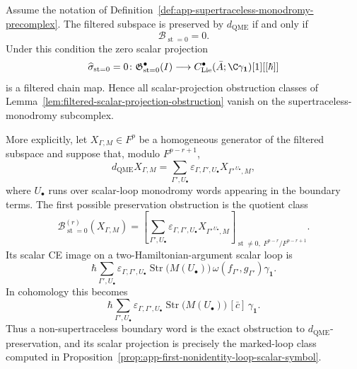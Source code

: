 \begin{thm}
\label{thm:app-supertraceless-monodromy-projection}
  Assume the notation of
  Definition~\ref{def:app-supertraceless-monodromy-precomplex}.  The
  filtered subspace is preserved by \(d_{\mathrm{QME}}\) if and only if
  \[
    \mathcal B_{\operatorname{st}=0}=0 .
  \]
  Under this condition the zero scalar projection
  \[
    \widehat\sigma_{\operatorname{st}=0}=0\colon
    \mathfrak G^\bullet_{\operatorname{st}=0}(I)
      \longrightarrow
    C^\bullet_{\mathrm{Lie}}(\bar A;\C\gamma_{\mathbf 1})[1][[\hbar]]
  \]
  is a filtered chain map.  Hence all scalar-projection obstruction
  classes of Lemma~\ref{lem:filtered-scalar-projection-obstruction}
  vanish on the supertraceless-monodromy subcomplex.

  More explicitly, let \(X_{\Gamma,M}\in F^p\) be a homogeneous
  generator of the filtered subspace and suppose that, modulo \(F^{p-r+1}\),
  \[
    d_{\mathrm{QME}}X_{\Gamma,M}
      =
    \sum_{\Gamma',U_\bullet}
      \varepsilon_{\Gamma,\Gamma',U_\bullet}
      X_{\Gamma'^{\,U_\bullet},M},
  \]
  where \(U_\bullet\) runs over scalar-loop monodromy words appearing in
  the boundary terms.  The first possible preservation obstruction is the
  quotient class
  \[
    \mathcal B^{(r)}_{\operatorname{st}=0}(X_{\Gamma,M})
      =
    \left[
      \sum_{\Gamma',U_\bullet}
      \varepsilon_{\Gamma,\Gamma',U_\bullet}
      X_{\Gamma'^{\,U_\bullet},M}
    \right]_{\operatorname{st}\neq0,\;F^{p-r}/F^{p-r+1}} .
  \]
  Its scalar CE image on a two-Hamiltonian-argument scalar loop is
  \[
    \hbar
    \sum_{\Gamma',U_\bullet}
      \varepsilon_{\Gamma,\Gamma',U_\bullet}
      \operatorname{Str}\!\bigl(M(U_\bullet)\bigr)\,
      \omega(f_{\Gamma'},g_{\Gamma'})\gamma_{\mathbf 1}.
  \]
  In cohomology this becomes
  \[
    \hbar
    \sum_{\Gamma',U_\bullet}
      \varepsilon_{\Gamma,\Gamma',U_\bullet}
      \operatorname{Str}\!\bigl(M(U_\bullet)\bigr)\,
      [\bar c]\,\gamma_{\mathbf 1}.
  \]
  Thus a non-supertraceless boundary word is the exact obstruction to
  \(d_{\mathrm{QME}}\)-preservation, and its scalar projection is precisely
  the marked-loop class computed in
  Proposition~\ref{prop:app-first-nonidentity-loop-scalar-symbol}.


\end{thm}
